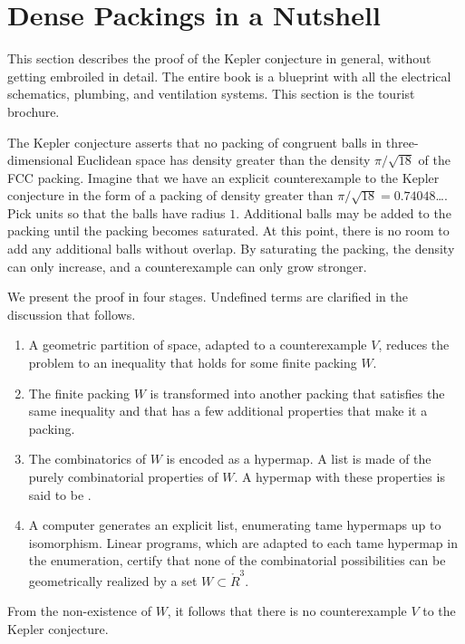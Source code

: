 \section{Dense Packings in a Nutshell}

This section describes the proof of the Kepler conjecture in general,
without
getting embroiled in detail.  The entire book
is a blueprint with all the electrical schematics, plumbing, and
ventilation systems.  This section is the tourist brochure.

The Kepler conjecture asserts that no packing of congruent balls in
three-dimensional Euclidean space has density greater than the density
$\pi/\sqrt{18}$ of the FCC packing.  Imagine that we
have an explicit counterexample to the Kepler conjecture in the form of a
packing of density greater than $\pi/\sqrt{18}= 0.74048$\dots.  Pick
units so that the balls have radius $1$.  Additional balls may be
added to the packing until the packing becomes saturated.  At this
point, there is no room to add any additional balls without overlap.
By saturating the packing, the density can only increase, and a
counterexample can only grow stronger.

We present the proof in four stages.  Undefined terms are clarified in the
discussion that follows.

\begin{enumerate}
\item A geometric partition of space, adapted to a counterexample $V$, 
reduces the problem to an inequality that holds for some finite packing $W$.
\item The finite packing $W$ is transformed into another packing that satisfies the same
inequality and that has a few additional properties that make it a  packing.
\item The combinatorics of $W$ is encoded as a hypermap.  A list is
  made of the purely combinatorial properties of $W$.  A hypermap with
  these properties is said to be .
\item A computer generates an explicit list, enumerating
  tame hypermaps up to isomorphism.  Linear programs, which are
  adapted to each tame hypermap in the enumeration, certify that
  none of the combinatorial possibilities can be geometrically realized by a set
  $W\subset \ring{R}^3$.
\end{enumerate}

From the non-existence of $W$, it follows that there is no
counterexample $V$ to the Kepler conjecture.



